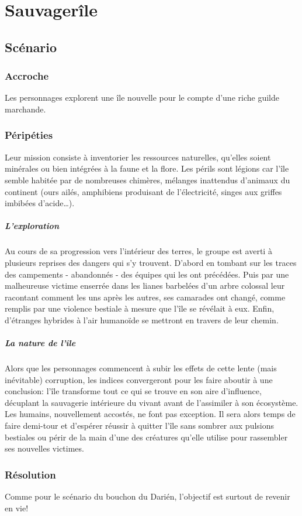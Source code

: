 \chapter{Sauvagerîle}

\section{Scénario}

\subsection{Accroche}

Les personnages explorent une île nouvelle pour le compte d'une riche guilde marchande.

\subsection{Péripéties}

Leur mission consiste à inventorier les ressources naturelles, qu'elles soient minérales ou bien intégrées à la faune et la flore.
Les périls sont légions car l'île semble habitée par de nombreuses chimères, mélanges inattendus d'animaux du continent (ours ailés, amphibiens produisant de l'électricité, singes aux griffes imbibées d'acide…).

\paragraph{L'exploration} Au cours de sa progression vers l'intérieur des terres, le groupe est averti à plusieurs reprises des dangers qui s'y trouvent.
D'abord en tombant sur les traces des campements - abandonnés - des équipes qui les ont précédées.
Puis par une malheureuse victime enserrée dans les lianes barbelées d'un arbre colossal leur racontant comment les uns après les autres, ses camarades ont changé, comme remplis par une violence bestiale à mesure que l'île se révélait à eux.
Enfin, d'étranges hybrides à l'air humanoïde se mettront en travers de leur chemin.

\paragraph{La nature de l'île} Alors que les personnages commencent à subir les effets de cette lente (mais inévitable) corruption, les indices convergeront pour les faire aboutir à une conclusion: l'île transforme tout ce qui se trouve en son aire d'influence, décuplant la sauvagerie intérieure du vivant avant de l'assimiler à son écosystème.
Les humains, nouvellement accostés, ne font pas exception.
Il sera alors temps de faire demi-tour et d'espérer réussir à quitter l'île sans sombrer aux pulsions bestiales ou périr de la main d'une des créatures qu'elle utilise pour rassembler ses nouvelles victimes.

\subsection{Résolution}

Comme pour le scénario du bouchon du Darién, l'objectif est surtout de revenir en vie!

\vfill
{}
\vfill
